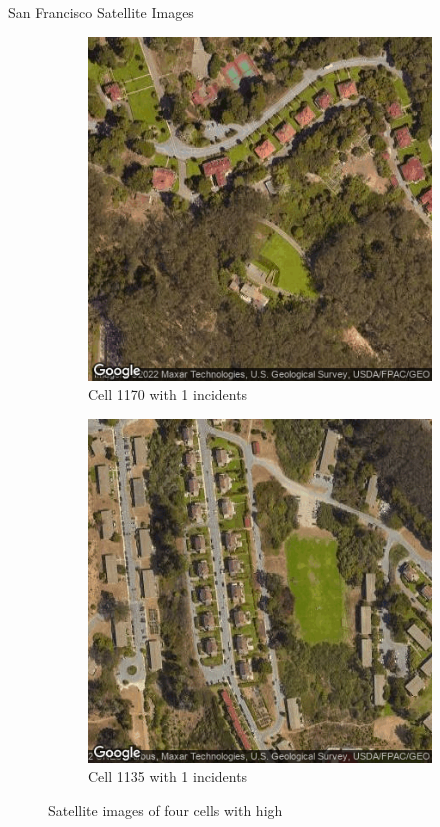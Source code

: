 \documentclass[10pt]{beamer}
\begin{document}
\begin{frame}{San Francisco Satellite Images}
\begin{figure}
\begin{subfigure}{.35\textwidth}
  \centering
  \includegraphics[width=0.7\linewidth]{1170.png}
  \caption{Cell 1170 with 1 incidents}
  \label{fig:sub1}
\end{subfigure}%
\begin{subfigure}{.35\textwidth}
  \centering
  \includegraphics[width=0.7\linewidth]{1135.png}
  \caption{Cell 1135 with 1 incidents}
  \label{fig:sub2}
\end{subfigure}
\caption{Satellite images of four cells with high}
\label{fig:test}
\end{figure}
 
\end{frame}
\end{document}
